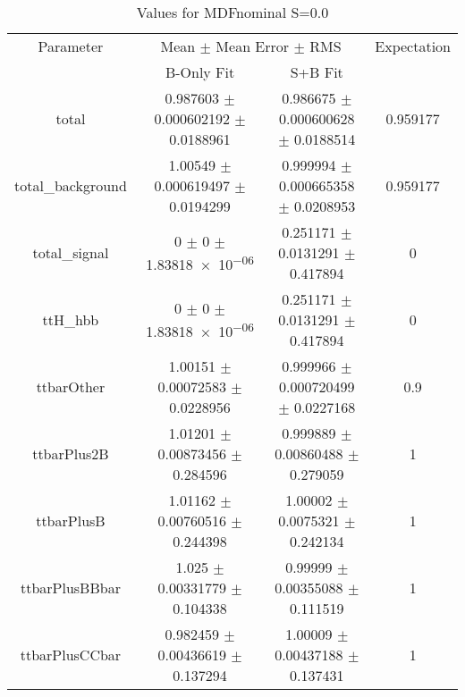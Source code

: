 \begin{table}
\centering
\caption{Values for MDFnominal S=0.0}
\begin{tabular}{cccc}
\toprule
Parameter & \multicolumn{2}{c}{Mean $\pm$ Mean Error $\pm$ RMS} & Expectation\\
 & B-Only Fit & S+B Fit & \\
\midrule
total & \num{0.987603} $\pm$ \num{0.000602192} $\pm$ \num{0.0188961} & \num{0.986675} $\pm$ \num{0.000600628} $\pm$ \num{0.0188514} & \num{0.959177}\\
total\_background & \num{1.00549} $\pm$ \num{0.000619497} $\pm$ \num{0.0194299} & \num{0.999994} $\pm$ \num{0.000665358} $\pm$ \num{0.0208953} & \num{0.959177}\\
total\_signal & \num{0} $\pm$ \num{0} $\pm$ \num{1.83818e-06} & \num{0.251171} $\pm$ \num{0.0131291} $\pm$ \num{0.417894} & \num{0}\\
ttH\_hbb & \num{0} $\pm$ \num{0} $\pm$ \num{1.83818e-06} & \num{0.251171} $\pm$ \num{0.0131291} $\pm$ \num{0.417894} & \num{0}\\
ttbarOther & \num{1.00151} $\pm$ \num{0.00072583} $\pm$ \num{0.0228956} & \num{0.999966} $\pm$ \num{0.000720499} $\pm$ \num{0.0227168} & \num{0.9}\\
ttbarPlus2B & \num{1.01201} $\pm$ \num{0.00873456} $\pm$ \num{0.284596} & \num{0.999889} $\pm$ \num{0.00860488} $\pm$ \num{0.279059} & \num{1}\\
ttbarPlusB & \num{1.01162} $\pm$ \num{0.00760516} $\pm$ \num{0.244398} & \num{1.00002} $\pm$ \num{0.0075321} $\pm$ \num{0.242134} & \num{1}\\
ttbarPlusBBbar & \num{1.025} $\pm$ \num{0.00331779} $\pm$ \num{0.104338} & \num{0.99999} $\pm$ \num{0.00355088} $\pm$ \num{0.111519} & \num{1}\\
ttbarPlusCCbar & \num{0.982459} $\pm$ \num{0.00436619} $\pm$ \num{0.137294} & \num{1.00009} $\pm$ \num{0.00437188} $\pm$ \num{0.137431} & \num{1}\\
\bottomrule
\end{tabular}
\end{table}
